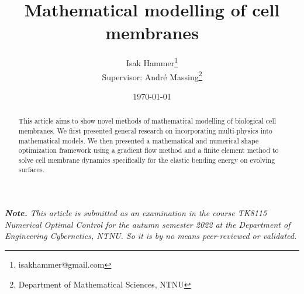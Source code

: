 \documentclass[10.8pt, a4paper, USenglish, twocolumn]{article}
\title{ {\Large \textbf{Mathematical modelling of cell membranes }} }
\author{Isak Hammer\footnote{isakhammer@gmail.com} \\{\small Supervisor: André Massing\footnote{Department of Mathematical Sciences, NTNU}} }
\date{\today}
\begin{document}
\maketitle
\begin{sloppy}
\textit{ \textbf{Note.} This article is submitted as an examination in the course TK8115 Numerical Optimal Control for the autumn semester 2022 at the Department of Engineering Cybernetics, NTNU. So it is by no means peer-reviewed or validated.}


\begin{abstract}
This article aims to show novel methods of mathematical modelling of biological cell membranes. We first presented general research on incorporating multi-physics into mathematical models. We then presented a mathematical and numerical shape optimization framework using a gradient flow method and a finite element method to solve cell membrane dynamics specifically for the elastic bending energy on evolving surfaces. 
\end{abstract}
    
    
    
    
    
    

    \printbibliography
\end{sloppy}
\end{document}

